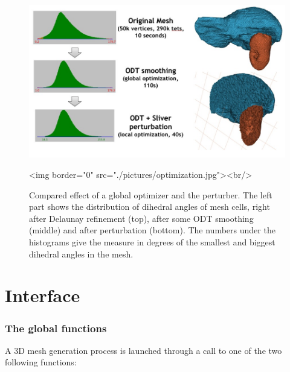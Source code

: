 \begin{figure}[ht]
\begin{center}
 \begin{ccTexOnly}
   \includegraphics[width=\textwidth]{Mesh_3/pictures/optimization}
 \end{ccTexOnly}
 \begin{ccHtmlOnly}
   <img border="0" src="./pictures/optimization.jpg"><br/>
 \end{ccHtmlOnly}
 \caption{Compared effect of a global optimizer and the perturber.
The left part shows the distribution of dihedral angles of mesh cells,
right after Delaunay refinement (top), after some ODT smoothing (middle) 
and after perturbation (bottom). The numbers under the histograms give
the measure in degrees of the
smallest and biggest dihedral angles in the  mesh.}
  \label{figure:optimization}
\end{center}
\end{figure}


\section{Interface}
\label{Mesh_3_section_interface}

\subsubsection{The global functions}
A 3D mesh generation  process is launched through a call
 to   one of the two following functions:
 
             

